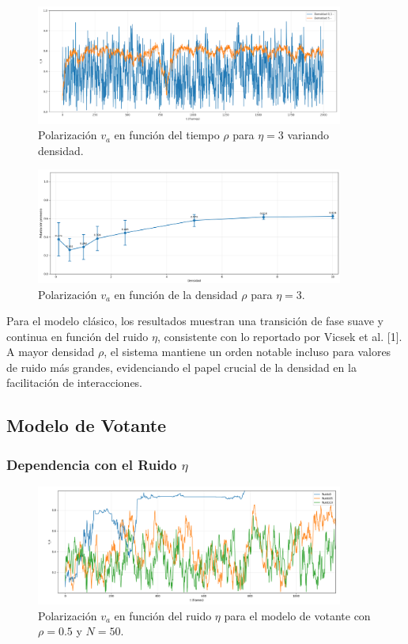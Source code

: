 \documentclass{article}
\begin{document}
\begin{figure}[H]
\centering
\includegraphics[width=0.9\textwidth]{19.png}
\caption{Polarización $v_a$ en función del tiempo $\rho$ para $\eta = 3$ variando densidad.}
\label{fig:19}
\end{figure}

\begin{figure}[H]
\centering
\includegraphics[width=0.9\textwidth]{20.png}
\caption{Polarización $v_a$ en función de la densidad $\rho$ para $\eta = 3$.}
\label{fig:20}
\end{figure}

Para el modelo clásico, los resultados muestran una transición de fase suave y continua en función del ruido $\eta$, consistente con lo reportado por Vicsek et al. [1]. A mayor densidad $\rho$, el sistema mantiene un orden notable incluso para valores de ruido más grandes, evidenciando el papel crucial de la densidad en la facilitación de interacciones.

\subsection{Modelo de Votante}
\subsubsection{Dependencia con el Ruido $\eta$}
\begin{figure}[H]
\centering
\includegraphics[width=0.9\textwidth]{Voter Densidad 0.5 Variando ruido.png}
\caption{Polarización $v_a$ en función del ruido $\eta$ para el modelo de votante con $\rho = 0.5$ y $N = 50$.}
\label{fig:va_vs_eta_voter}
\end{figure}
\end{document}
